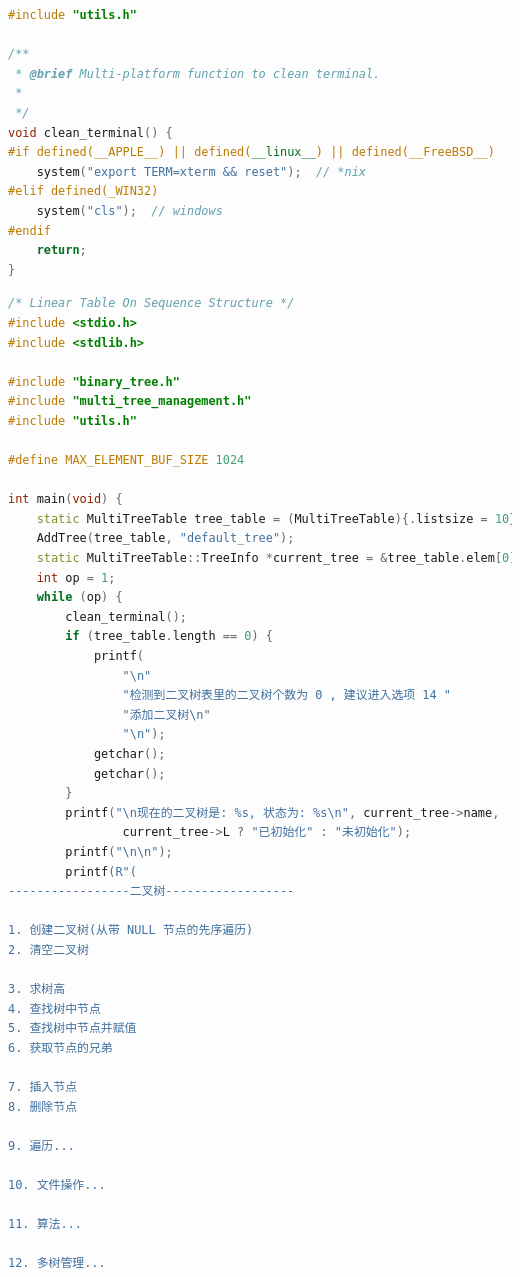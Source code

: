 \documentclass[supercite]{Experimental_Report}
\theoremstyle{definition}
\begin{document}
\begin{lstlisting}[caption={$utils.cpp$}, language=C++, frame=single]
#include "utils.h"

/**
 * @brief Multi-platform function to clean terminal.
 *
 */
void clean_terminal() {
#if defined(__APPLE__) || defined(__linux__) || defined(__FreeBSD__)
    system("export TERM=xterm && reset");  // *nix
#elif defined(_WIN32)
    system("cls");  // windows
#endif
    return;
}
\end{lstlisting}

\begin{lstlisting}[caption={$main.cpp$}, language=C++, frame=single]
/* Linear Table On Sequence Structure */
#include <stdio.h>
#include <stdlib.h>

#include "binary_tree.h"
#include "multi_tree_management.h"
#include "utils.h"

#define MAX_ELEMENT_BUF_SIZE 1024

int main(void) {
	static MultiTreeTable tree_table = (MultiTreeTable){.listsize = 10};
	AddTree(tree_table, "default_tree");
	static MultiTreeTable::TreeInfo *current_tree = &tree_table.elem[0];
	int op = 1;
	while (op) {
		clean_terminal();
		if (tree_table.length == 0) {
			printf(
				"\n"
				"检测到二叉树表里的二叉树个数为 0 , 建议进入选项 14 "
				"添加二叉树\n"
				"\n");
			getchar();
			getchar();
		}
		printf("\n现在的二叉树是: %s, 状态为: %s\n", current_tree->name,
				current_tree->L ? "已初始化" : "未初始化");
		printf("\n\n");
		printf(R"(
-----------------二叉树------------------

1. 创建二叉树(从带 NULL 节点的先序遍历)
2. 清空二叉树

3. 求树高
4. 查找树中节点
5. 查找树中节点并赋值
6. 获取节点的兄弟

7. 插入节点
8. 删除节点

9. 遍历...

10. 文件操作...

11. 算法...

12. 多树管理...


\end{lstlisting}
\end{document}
